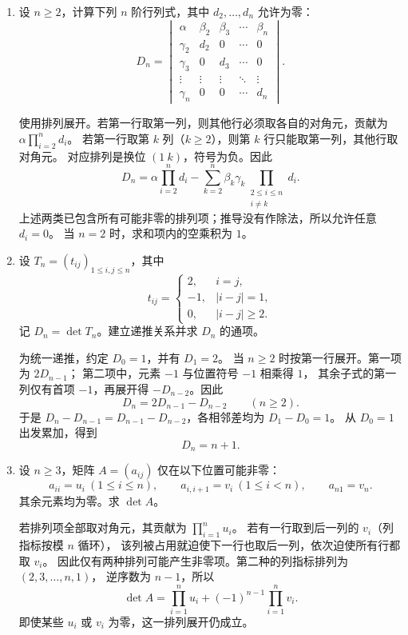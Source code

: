 \documentclass[UTF8,12pt,a4paper,fontset=fandol]{ctexart}
\begin{document}
\begin{enumerate}[label=\arabic*.,resume=detquestions]
\item\label{q:arrow}
设 $n\geq2$，计算下列 $n$ 阶行列式，其中 $d_2,\ldots,d_n$ 允许为零：
\[
D_n=\begin{vmatrix}
\alpha&\beta_2&\beta_3&\cdots&\beta_n\\
\gamma_2&d_2&0&\cdots&0\\
\gamma_3&0&d_3&\cdots&0\\
\vdots&\vdots&\vdots&\ddots&\vdots\\
\gamma_n&0&0&\cdots&d_n
\end{vmatrix}.
\]
\begin{solve}
使用排列展开。若第一行取第一列，则其他行必须取各自的对角元，贡献为
$\alpha\prod_{i=2}^n d_i$。
若第一行取第 $k$ 列（$k\geq2$），则第 $k$ 行只能取第一列，其他行取对角元。
对应排列是换位 $(1\ k)$，符号为负。因此
\[
\boxed{D_n=\alpha\prod_{i=2}^n d_i
-\sum_{k=2}^n\beta_k\gamma_k
\prod_{\substack{2\leq i\leq n\\i\ne k}}d_i.}
\]
上述两类已包含所有可能非零的排列项；推导没有作除法，所以允许任意 $d_i=0$。
当 $n=2$ 时，求和项内的空乘积为 $1$。
\end{solve}

\item\label{q:tridiagonal}
设 $T_n=(t_{ij})_{1\leq i,j\leq n}$，其中
\[
t_{ij}=\begin{cases}2,&i=j,\\-1,&|i-j|=1,\\0,&|i-j|\geq2.\end{cases}
\]
记 $D_n=\det T_n$。建立递推关系并求 $D_n$ 的通项。
\begin{solve}
为统一递推，约定 $D_0=1$，并有 $D_1=2$。
当 $n\geq2$ 时按第一行展开。第一项为 $2D_{n-1}$；
第二项中，元素 $-1$ 与位置符号 $-1$ 相乘得 $1$，
其余子式的第一列仅有首项 $-1$，再展开得 $-D_{n-2}$。因此
\[
D_n=2D_{n-1}-D_{n-2}\qquad(n\geq2).
\]
于是 $D_n-D_{n-1}=D_{n-1}-D_{n-2}$，各相邻差均为 $D_1-D_0=1$。
从 $D_0=1$ 出发累加，得到
\[
\boxed{D_n=n+1.}
\]
\end{solve}

\item\label{q:cyclic}
设 $n\geq3$，矩阵 $A=(a_{ij})$ 仅在以下位置可能非零：
\[
a_{ii}=u_i\ (1\leq i\leq n),\qquad
a_{i,i+1}=v_i\ (1\leq i<n),\qquad a_{n1}=v_n.
\]
其余元素均为零。求 $\det A$。
\begin{solve}
若排列项全部取对角元，其贡献为 $\prod_{i=1}^n u_i$。
若有一行取到后一列的 $v_i$（列指标按模 $n$ 循环），
该列被占用就迫使下一行也取后一列，依次迫使所有行都取 $v_i$。
因此仅有两种排列可能产生非零项。第二种的列指标排列为 $(2,3,\ldots,n,1)$，
逆序数为 $n-1$，所以
\[
\boxed{\det A=\prod_{i=1}^n u_i+(-1)^{n-1}\prod_{i=1}^n v_i.}
\]
即使某些 $u_i$ 或 $v_i$ 为零，这一排列展开仍成立。
\end{solve}


\end{enumerate}
\end{document}
